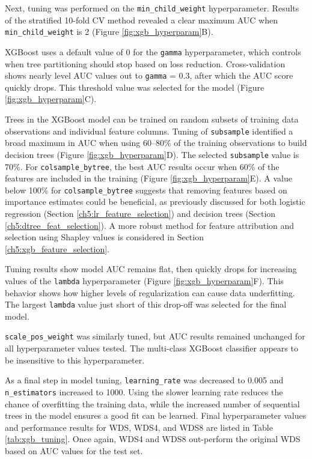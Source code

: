 Next, tuning was performed on the \verb|min_child_weight| hyperparameter. Results of the stratified 10-fold CV method revealed a clear maximum AUC when \verb|min_child_weight| is 2 (Figure \ref{fig:xgb_hyperparam}B).

XGBoost uses a default value of 0 for the \verb|gamma| hyperparameter, which controls when tree partitioning should stop based on loss reduction. Cross-validation shows nearly level AUC values out to \verb|gamma| = 0.3, after which the AUC score quickly drops. This threshold value was selected for the model (Figure \ref{fig:xgb_hyperparam}C).

Trees in the XGBoost model can be trained on random subsets of training data observations and individual feature columns. Tuning of \verb|subsample| identified a broad maximum in AUC when using 60--80\% of the training observations to build decision trees (Figure \ref{fig:xgb_hyperparam}D). The selected \verb|subsample| value is 70\%. For \verb|colsample_bytree|, the best AUC results occur when 60\% of the features are included in the training (Figure \ref{fig:xgb_hyperparam}E). A value below 100\% for \verb|colsample_bytree| suggests that removing features based on importance estimates could be beneficial, as previously discussed for both logistic regression (Section \ref{ch5:lr_feature_selection}) and decision trees (Section \ref{ch5:dtree_feat_selection}). A more robust method for feature attribution and selection using Shapley values is considered in Section \ref{ch5:xgb_feature_selection}.

Tuning results show model AUC remains flat, then quickly drops for increasing values of the \verb|lambda| hyperparameter (Figure \ref{fig:xgb_hyperparam}F). This behavior shows how higher levels of regularization can cause data underfitting. The largest \verb|lambda| value just short of this drop-off was selected for the final model.

\verb|scale_pos_weight| was similarly tuned, but AUC results remained unchanged for all hyperparameter values tested. The multi-class XGBoost classifier appears to be insensitive to this hyperparameter.

As a final step in model tuning, \verb|learning_rate| was decreased to 0.005 and \verb|n_estimators| increased to 1000. Using the slower learning rate reduces the chance of overfitting the training data, while the increased number of sequential trees in the model ensures a good fit can be learned. Final hyperparameter values and performance results for WDS, WDS4, and WDS8 are listed in Table \ref{tab:xgb_tuning}. Once again, WDS4 and WDS8 out-perform the original WDS based on AUC values for the test set.

